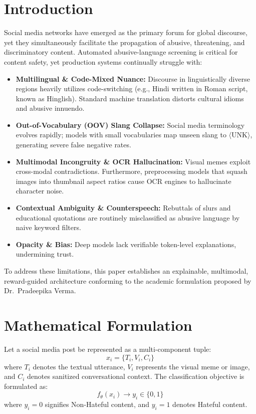 \documentclass[11pt]{article}
\begin{document}
\section{Introduction}
Social media networks have emerged as the primary forum for global discourse, yet they simultaneously facilitate the propagation of abusive, threatening, and discriminatory content. Automated abusive-language screening is critical for content safety, yet production systems continually struggle with:
\begin{itemize}
    \item \textbf{Multilingual \& Code-Mixed Nuance:} Discourse in linguistically diverse regions heavily utilizes code-switching (e.g., Hindi written in Roman script, known as Hinglish). Standard machine translation distorts cultural idioms and abusive innuendo.
    \item \textbf{Out-of-Vocabulary (OOV) Slang Collapse:} Social media terminology evolves rapidly; models with small vocabularies map unseen slang to $\langle\text{UNK}\rangle$, generating severe false negative rates.
    \item \textbf{Multimodal Incongruity \& OCR Hallucination:} Visual memes exploit cross-modal contradictions. Furthermore, preprocessing models that squash images into thumbnail aspect ratios cause OCR engines to hallucinate character noise.
    \item \textbf{Contextual Ambiguity \& Counterspeech:} Rebuttals of slurs and educational quotations are routinely misclassified as abusive language by naive keyword filters.
    \item \textbf{Opacity \& Bias:} Deep models lack verifiable token-level explanations, undermining trust.
\end{itemize}

To address these limitations, this paper establishes an explainable, multimodal, reward-guided architecture conforming to the academic formulation proposed by Dr.~Pradeepika Verma.

\section{Mathematical Formulation}
Let a social media post be represented as a multi-component tuple:
\begin{equation}
    x_i = \{T_i, V_i, C_i\}
\end{equation}
where $T_i$ denotes the textual utterance, $V_i$ represents the visual meme or image, and $C_i$ denotes sanitized conversational context. The classification objective is formulated as:
\begin{equation}
    f_\theta(x_i) \to y_i \in \{0, 1\}
\end{equation}
where $y_i = 0$ signifies Non-Hateful content, and $y_i = 1$ denotes Hateful content.
\end{document}
